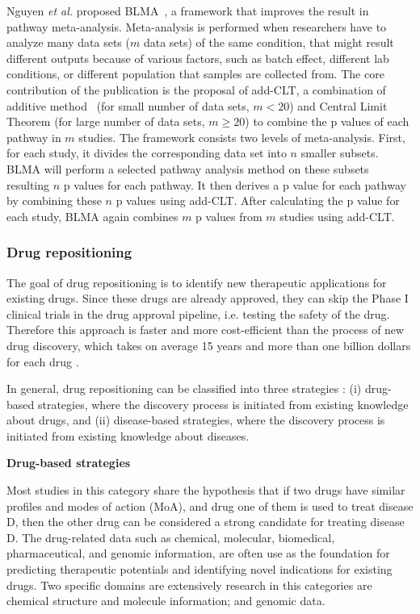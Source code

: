 Nguyen \textit{et al.} proposed BLMA~\cite{nguyen2017blma,nguyen2015novel}, a framework that improves the result in pathway meta-analysis. Meta-analysis is performed when researchers have to analyze many data sets ($m$ data sets) of the same condition, that might result different outputs because of various factors, such as batch effect, different lab conditions, or different population that samples are collected from.
The core contribution of the publication is the proposal of add-CLT, a combination of additive method~\cite{edgington1972additive} (for small number of data sets, $m < 20$) and Central Limit Theorem (for large number of data sets, $m \geq 20$) to combine the p values of each pathway in $m$ studies.
The framework consists two levels of meta-analysis. First, for each study, it divides the corresponding data set into $n$ smaller subsets. BLMA will perform a selected pathway analysis method on these subsets resulting $n$ p values for each pathway. It then derives a p value for each pathway by combining these $n$ p values using add-CLT. After calculating the p value for each study, BLMA again combines $m$ p values from $m$ studies using add-CLT.




\subsubsection{Drug repositioning}

The goal of drug repositioning is to identify new therapeutic applications for existing drugs. Since these drugs are already approved, they can skip the Phase I clinical trials in the drug approval pipeline, i.e. testing the safety of the drug. Therefore this approach is faster and more cost-efficient than the process of new drug discovery, which takes on average 15 years and more than one billion dollars for each drug \cite{chong2007new}. 

In general, drug repositioning can be classified into three strategies \cite{jarada2020review}: (i) drug-based strategies, where the discovery process is initiated from existing knowledge about drugs, and (ii) disease-based strategies, where the discovery process is initiated from existing knowledge about diseases. %

\textbf{Drug-based strategies}

Most studies in this category share the hypothesis that if two drugs have similar profiles and modes of action (MoA), and drug one of them is used to treat disease D, then the other drug can be considered a strong candidate for treating disease D. The drug-related data such as chemical, molecular, biomedical, pharmaceutical, and genomic information, are often use as the foundation for predicting therapeutic potentials and identifying novel indications for existing drugs. Two specific domains are extensively research in this categories are chemical structure and molecule information; and genomic data.

